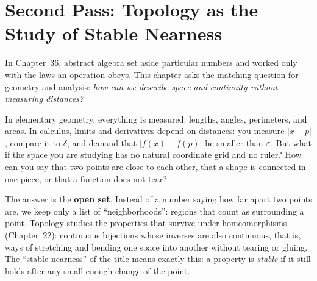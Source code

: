 \section{Second Pass: Topology as the Study of Stable Nearness}
\chapterline

In Chapter~36, abstract algebra set aside particular numbers and worked only with the laws an operation obeys. This chapter asks the matching question for geometry and analysis: \emph{how can we describe space and continuity without measuring distances?}

In elementary geometry, everything is measured: lengths, angles, perimeters, and areas. In calculus, limits and derivatives depend on distances: you measure $|x - p|$, compare it to $\delta$, and demand that $|f(x) - f(p)|$ be smaller than $\varepsilon$. But what if the space you are studying has no natural coordinate grid and no ruler? How can you say that two points are close to each other, that a shape is connected in one piece, or that a function does not tear?

The answer is the \textbf{open set}. Instead of a number saying how far apart two points are, we keep only a list of ``neighborhoods'': regions that count as surrounding a point. Topology studies the properties that survive under homeomorphisms (Chapter~22): continuous bijections whose inverses are also continuous, that is, ways of stretching and bending one space into another without tearing or gluing. The ``stable nearness'' of the title means exactly this: a property is \emph{stable} if it still holds after any small enough change of the point.

